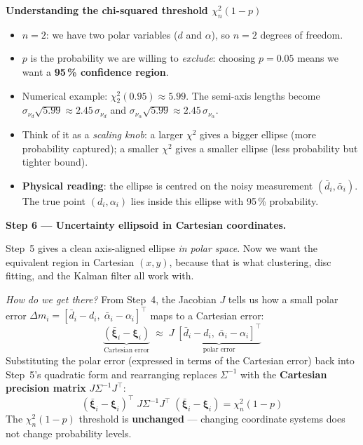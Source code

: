 \documentclass[12pt, a4paper]{article}
\begin{document}
\begin{notebox}
  \textbf{Understanding the chi-squared threshold $\chi^2_n(1-p)$}

  \begin{itemize}[leftmargin=1.2em,itemsep=3pt]
    \item $n = 2$: we have two polar variables ($d$ and $\alpha$), so
      $n=2$ degrees of freedom.
    \item $p$ is the probability we are willing to \emph{exclude}: choosing
      $p=0.05$ means we want a \textbf{95\,\% confidence region}.
    \item Numerical example: $\chi^2_2(0.95) \approx 5.99$.
      The semi-axis lengths become
      $\sigma_{\nu_d}\sqrt{5.99} \approx 2.45\,\sigma_{\nu_d}$
      and
      $\sigma_{\nu_\alpha}\sqrt{5.99} \approx 2.45\,\sigma_{\nu_\alpha}$.
    \item Think of it as a \emph{scaling knob}: a larger $\chi^2$ gives a
      bigger ellipse (more probability captured); a smaller $\chi^2$ gives
      a smaller ellipse (less probability but tighter bound).
    \item \textbf{Physical reading}: the ellipse is centred on the noisy
      measurement $(\bar{d}_i,\bar{\alpha}_i)$.
      The true point $(d_i, \alpha_i)$ lies inside this ellipse
      with 95\,\% probability.
  \end{itemize}
\end{notebox}

\textbf{Step 6 --- Uncertainty ellipsoid in Cartesian coordinates.}

Step~5 gives a clean axis-aligned ellipse \emph{in polar space}.
Now we want the equivalent region in Cartesian $(x,y)$, because that is
what clustering, disc fitting, and the Kalman filter all work with.

\textit{How do we get there?}
From Step~4, the Jacobian $J$ tells us how a small polar error
$\Delta m_i = [\bar{d}_i - d_i,\;\bar{\alpha}_i - \alpha_i]^\top$
maps to a Cartesian error:
\[
  \underbrace{(\bar{\boldsymbol{\xi}}_i - \boldsymbol{\xi}_i)}_{\text{Cartesian error}}
  \;\approx\;
  J \;\underbrace{[\bar{d}_i-d_i,\;\bar{\alpha}_i-\alpha_i]^\top}_{\text{polar error}}
\]
Substituting the polar error (expressed in terms of the Cartesian error)
back into Step~5's quadratic form and rearranging replaces $\Sigma^{-1}$
with the \textbf{Cartesian precision matrix} $J\Sigma^{-1}J^\top$:
\[
  (\bar{\boldsymbol{\xi}}_i - \boldsymbol{\xi}_i)^\top
  \; J \Sigma^{-1} J^\top \;
  (\bar{\boldsymbol{\xi}}_i - \boldsymbol{\xi}_i)
  = \chi^2_n(1-p)
\]
The $\chi^2_n(1-p)$ threshold is \textbf{unchanged} ---
changing coordinate systems does not change probability levels.
\end{document}
